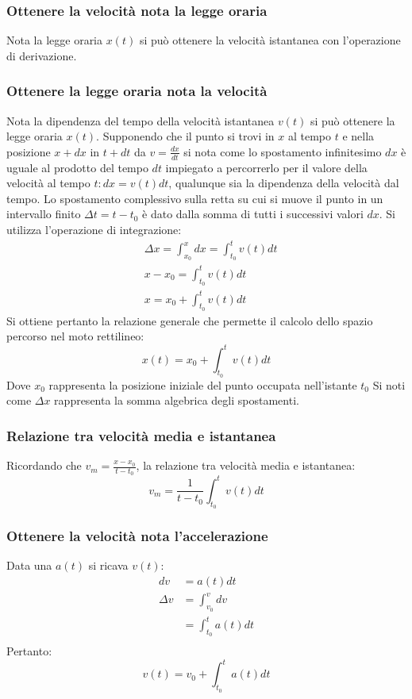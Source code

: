 \documentclass[class=book, crop=false, oneside, 12pt]{standalone}
\begin{document}
    \subsubsection{Ottenere la velocit\`a nota la legge oraria}
    Nota la legge oraria $x(t)$ si pu\`o ottenere la velocit\`a istantanea con l'operazione di derivazione.
    \subsubsection{Ottenere la legge oraria nota la velocit\`a}
		Nota la dipendenza del tempo della velocit\`a istantanea $v(t)$ si pu\`o ottenere la legge oraria $x(t)$.
		Supponendo che il punto si trovi in $x$ al tempo $t$ e nella posizione $x+dx$ in $t+dt$ da $v=\frac{dx}{dt}$ si nota come lo spostamento infinitesimo $dx$ \`e uguale al prodotto del tempo $dt$ impiegato a percorrerlo per il valore della velocit\`a al tempo $t:dx=v(t)dt$, qualunque sia la dipendenza della velocit\`a dal tempo.
		Lo spostamento complessivo sulla retta su cui si muove il punto in un intervallo finito $\Delta t = t - t_0$ \`e dato dalla somma di tutti i successivi valori $dx$.
		Si utilizza l'operazione di integrazione:
		\begin{align*}
			&\Delta x = \int_{x_0}^x dx = \int_{t_0}^t v(t)dt\\
			&x - x_0 = \int_{t_0}^t v(t)dt\\
			&x = x_0 +\int_{t_0}^tv(t)dt
		\end{align*}
		Si ottiene pertanto la relazione generale che permette il calcolo dello spazio percorso nel moto rettilineo:
		$$x(t) = x_0 + \int_{t_0}^t v(t)dt$$
		Dove $x_0$ rappresenta la posizione iniziale del punto occupata nell'istante $t_0$
		Si noti come $\Delta x$ rappresenta la somma algebrica degli spostamenti.
		\subsubsection{Relazione tra velocit\`a media e istantanea}
		Ricordando che $v_m = \frac{x-x_0}{t-t_0}$, la relazione tra velocit\`a media e istantanea:
		$$v_m = \dfrac{1}{t-t_0}\int_{t_0}^{t}v(t)dt$$
		\subsubsection{Ottenere la velocit\`a nota l'accelerazione}
		Data una $a(t)$ si ricava $v(t)$:
		\begin{align*}
			dv &=a(t)dt\\
			\Delta v &= \int_{v_0}^v dv\\
			   &=\int_{t_0}^t a(t)dt\\
		\end{align*}
		Pertanto:
		$$v(t) = v_0 + \int_{t_0}^t a(t)dt$$
\end{document}
